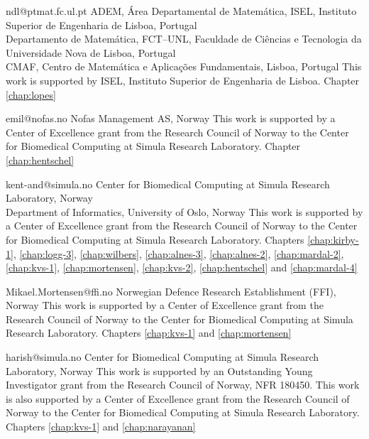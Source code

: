              {ndl@ptmat.fc.ul.pt}
             {ADEM, \'{A}rea Departamental de Matem\'{a}tica,
              ISEL, Instituto Superior de Engenharia de Lisboa, Portugal \\
              Departamento de Matem\'{a}tica, FCT--UNL,
              Faculdade de Ci\^{e}ncias e Tecnologia da Universidade Nova de Lisboa, Portugal \\
              CMAF, Centro de Matem\'{a}tica e Aplica\c{c}\~{o}es Fundamentais, Lisboa, Portugal}
              {This work is supported by ISEL, Instituto Superior de Engenharia de Lisboa.}
              {Chapter \ref{chap:lopes}}

             {emil@nofas.no}
             {Nofas Management AS, Norway}
             {This work is supported by a Center of Excellence
              grant from the Research Council of Norway to the Center
              for Biomedical Computing at Simula Research
              Laboratory.}
             {Chapter \ref{chap:hentschel}}

             {kent-and@simula.no}
             {Center for Biomedical Computing at Simula Research Laboratory, Norway \\
              Department of Informatics, University of Oslo, Norway}
             {This work is supported by a Center of Excellence grant
              from the Research Council of Norway to the Center for
              Biomedical Computing at Simula Research Laboratory.}
             {Chapters
              \ref{chap:kirby-1}, \ref{chap:logg-3}, \ref{chap:wilbers},
              \ref{chap:alnes-3}, \ref{chap:alnes-2}, \ref{chap:mardal-2},
              \ref{chap:kvs-1}, \ref{chap:mortensen}, \ref{chap:kvs-2},
              \ref{chap:hentschel} and \ref{chap:mardal-4}}

             {Mikael.Mortensen@ffi.no}
             {Norwegian Defence Research Establishment (FFI), Norway}
             {This work is supported by a Center of Excellence
              grant from the Research Council of Norway to the Center
              for Biomedical Computing at Simula Research
              Laboratory.}
             {Chapters \ref{chap:kvs-1} and \ref{chap:mortensen}}

             {harish@simula.no}
             {Center for Biomedical Computing at Simula Research Laboratory, Norway}
             {This work is supported by an Outstanding Young
              Investigator grant from the Research Council of Norway,
              NFR 180450. This work is also supported by a Center of
              Excellence grant from the Research Council of Norway to
              the Center for Biomedical Computing at Simula Research
              Laboratory.}
             {Chapters \ref{chap:kvs-1} and \ref{chap:narayanan}}

